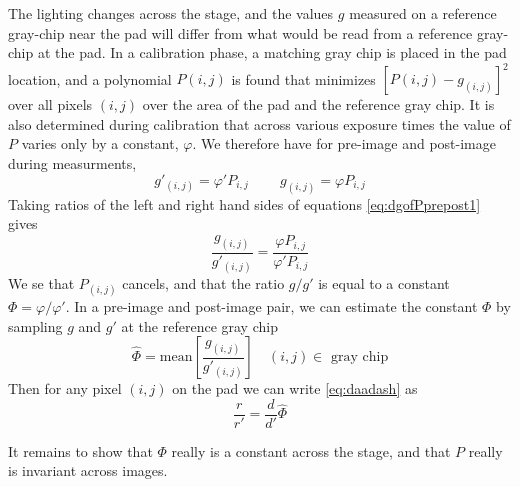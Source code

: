 \documentclass[11pt,letter]{article}
\begin{document}
The lighting changes across the stage, and the values $g$ measured on a reference gray-chip near the pad will differ from what would be read from a reference gray-chip at the pad.
In a calibration phase, a matching gray chip is placed in the pad location, and a polynomial $P(i,j)$ is found 
that minimizes $[P(i,j) - g_{(i,j)}]^2$ over all pixels $(i,j)$ over the area of the pad and the reference gray chip.
It is also determined during calibration that across various exposure times the value of $P$ varies only by a constant, $\varphi$. 
We therefore have for pre-image and post-image during measurments, 
\begin{equation} \label{eq:dgofPprepost1}
	g'_{(i,j)} = \varphi' P_{i,j} \qquad \ g_{(i,j)} = \varphi P_{i,j} 
\end{equation}
Taking ratios of the left and right hand sides of equations \eqref{eq:dgofPprepost1} gives
\begin{equation} \label{eq:dgofPprepost2}
	\frac{g_{(i,j)}}{g'_{(i,j)}} = \frac{\varphi P_{i,j}}{\varphi' P_{i,j}} 
\end{equation}
We se that $P_{(i,j)}$ cancels, and that the ratio $g/g'$ is equal to a constant $\Phi = \varphi/\varphi'$.
In a pre-image and post-image pair, we can estimate the constant $\Phi$ by sampling $g$ and $g'$ at the reference gray chip
\begin{equation} \label{eq:dgofPprepost3}
	\widehat\Phi = \text{mean}\left[\frac{g_{(i,j)}}{g'_{(i,j)}}\right] \quad (i,j)\in\text{ gray chip}
\end{equation}
Then for any pixel $(i,j)$ on the pad we can write \eqref{eq:daadash} as 
\begin{equation}
	\frac{r}{r'} = \frac{d}{d'} \widehat\Phi
	\label{eq:daadashPhi}
\end{equation}

It remains to show that $\Phi$ really is a constant across the stage, 
and that $P$ really is invariant across images.
\end{document}
